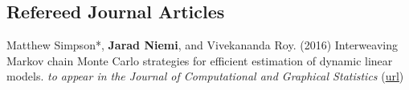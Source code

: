 \documentclass[overlapped,line]{res}
\newcommand{\lastpromo}{}
\begin{document}
\begin{resume}
% 
% 
% 
% 
% 
% 
% 
% 
% 
% 
% 
% 

\subsection{\bf Refereed Journal Articles}

\lastpromo

Matthew Simpson*, {\bf Jarad Niemi}, and Vivekananda Roy. (2016) Interweaving Markov chain Monte Carlo strategies for efficient estimation of dynamic linear models. \emph{to appear in the Journal of Computational and Graphical Statistics} (\href{http://www.tandfonline.com/doi/abs/10.1080/10618600.2015.1105748}{url})


\end{resume}
\end{document}
